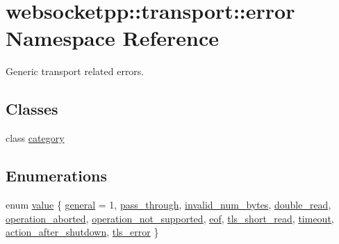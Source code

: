 \hypertarget{namespacewebsocketpp_1_1transport_1_1error}{}\section{websocketpp\+:\+:transport\+:\+:error Namespace Reference}
\label{namespacewebsocketpp_1_1transport_1_1error}


Generic transport related errors.  


\subsection*{Classes}
\begin{DoxyCompactItemize}
\item 
class \mbox{\hyperlink{classwebsocketpp_1_1transport_1_1error_1_1category}{category}}
\end{DoxyCompactItemize}
\subsection*{Enumerations}
\begin{DoxyCompactItemize}
\item 
enum \mbox{\hyperlink{namespacewebsocketpp_1_1transport_1_1error_a8d371a2562d813e5a2e106e2694d4fb0}{value}} \{ \newline
\mbox{\hyperlink{namespacewebsocketpp_1_1transport_1_1error_a8d371a2562d813e5a2e106e2694d4fb0a161bc0c8148996271f7126aea2c24416}{general}} = 1, 
\mbox{\hyperlink{namespacewebsocketpp_1_1transport_1_1error_a8d371a2562d813e5a2e106e2694d4fb0a6a7cb8ef776c9eabe2324a529e991732}{pass\+\_\+through}}, 
\mbox{\hyperlink{namespacewebsocketpp_1_1transport_1_1error_a8d371a2562d813e5a2e106e2694d4fb0ab91204a395d7377d5eed5a789641a0ea}{invalid\+\_\+num\+\_\+bytes}}, 
\mbox{\hyperlink{namespacewebsocketpp_1_1transport_1_1error_a8d371a2562d813e5a2e106e2694d4fb0af77cb7d0fde9597a2f022a5eca0bdf61}{double\+\_\+read}}, 
\newline
\mbox{\hyperlink{namespacewebsocketpp_1_1transport_1_1error_a8d371a2562d813e5a2e106e2694d4fb0a887436887a8732e48f7c67bd85bb6f64}{operation\+\_\+aborted}}, 
\mbox{\hyperlink{namespacewebsocketpp_1_1transport_1_1error_a8d371a2562d813e5a2e106e2694d4fb0a7c3708669e1de6d4986d1db769fe214e}{operation\+\_\+not\+\_\+supported}}, 
\mbox{\hyperlink{namespacewebsocketpp_1_1transport_1_1error_a8d371a2562d813e5a2e106e2694d4fb0a73dd0d0f22cd67b7bcc031cd6bdef743}{eof}}, 
\mbox{\hyperlink{namespacewebsocketpp_1_1transport_1_1error_a8d371a2562d813e5a2e106e2694d4fb0af716728e7a91dafb4439a15e7c638112}{tls\+\_\+short\+\_\+read}}, 
\newline
\mbox{\hyperlink{namespacewebsocketpp_1_1transport_1_1error_a8d371a2562d813e5a2e106e2694d4fb0a0e2f0627b4105746429d747f6137b37e}{timeout}}, 
\mbox{\hyperlink{namespacewebsocketpp_1_1transport_1_1error_a8d371a2562d813e5a2e106e2694d4fb0acabe9e6ae399d59c020c9f78930f01f6}{action\+\_\+after\+\_\+shutdown}}, 
\mbox{\hyperlink{namespacewebsocketpp_1_1transport_1_1error_a8d371a2562d813e5a2e106e2694d4fb0a8e68893bc224f55aae654318734dcd40}{tls\+\_\+error}}
 \}
\end{DoxyCompactItemize}
